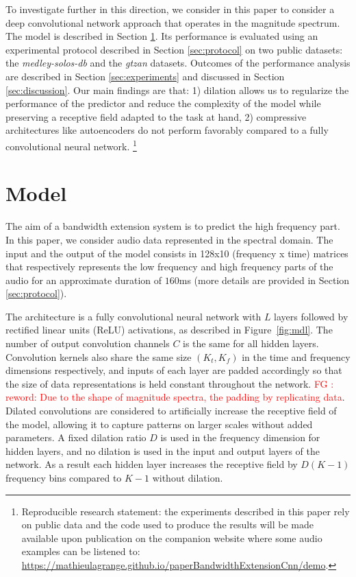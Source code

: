 \documentclass{article}
\newcommand{\fg}[1]{\textcolor{red}{FG : #1}}
\begin{document}
To investigate further in this direction, we consider in this paper to consider a deep convolutional network approach that operates in the magnitude spectrum. The model is described in Section \ref{sec:model}. Its performance is evaluated using an experimental protocol described in Section \ref{sec:protocol} on two public datasets: the \textit{medley-solos-db} and the \textit{gtzan} datasets. Outcomes of the performance analysis are described in Section \ref{sec:experiments} and discussed in Section \ref{sec:discussion}. Our main findings are that: 1) dilation allows us to regularize the performance of the predictor and reduce the complexity of the model while preserving a receptive field adapted to the task at hand, 2) compressive architectures like autoencoders do not perform favorably compared to a fully convolutional neural network. \footnote{Reproducible research statement: the experiments described in this paper rely on public data and the code used to produce the results will be made available upon publication on the companion website where some audio examples can be listened to: \url{https://mathieulagrange.github.io/paperBandwidthExtensionCnn/demo}.}

\section{Model}
\label{sec:model}

The aim of a bandwidth extension system is to predict the high frequency part. In this paper, we consider audio data represented in the spectral domain. The input and the output of the model consists in 128x10 (frequency x time) matrices that respectively represents the low frequency and high frequency parts of the audio for an approximate duration of $160$ms (more details are provided in Section \ref{sec:protocol}).

The architecture is a fully convolutional neural network \cite{long2015fully} with $L$ layers followed by rectified linear units (ReLU) activations, as described in Figure~\ref{fig:mdl}. The number of output convolution channels $C$ is the same for all hidden layers. Convolution kernels also share the same size $(K_t, K_f)$ in the time and frequency dimensions respectively, and inputs of each layer are padded accordingly so that the size of data representations is held constant throughout the network. \fg{reword: Due to the shape of magnitude spectra, the padding by replicating data}. Dilated convolutions \cite{yu2016multi, oord2016wavenet} are considered to artificially increase the receptive field of the model, allowing it to capture patterns on larger scales without added parameters. A fixed dilation ratio $D$ is used in the frequency dimension for hidden layers, and no dilation is used in the input and output layers of the network. As a result each hidden layer increases the receptive field by $D(K-1)$ frequency bins compared to $K-1$ without dilation.
\end{document}
